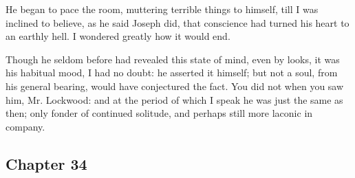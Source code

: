 \par He began to pace the room, muttering terrible things to himself, till I was inclined to believe, as he said Joseph did, that conscience had turned his heart to an earthly hell. I wondered greatly how it would end.
\par Though he seldom before had revealed this state of mind, even by looks, it was his habitual mood, I had no doubt: he asserted it himself; but not a soul, from his general bearing, would have conjectured the fact. You did not when you saw him, Mr. Lockwood: and at the period of which I speak he was just the same as then; only fonder of continued solitude, and perhaps still more laconic in company.





\subsection*{Chapter 34}

